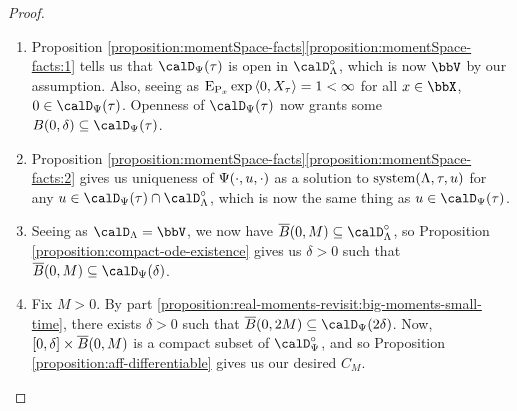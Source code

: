 \begin{proof}
  \begin{enumerate}[label=(\alph*)]
    \item
      Proposition \ref{proposition:momentSpace-facts}\ref{proposition:momentSpace-facts:1} tells us that $\momentSpace(\tau)$ is open in $\odeSpace^\circ$, which is now $\vecSpace$ by our assumption.
      Also, seeing as ${\operatorname{E}}_{{\operatorname{P}}_x}\exp{\langle 0 , X_\tau \rangle} = 1 < \infty$ for all $\stateVar \in \stateSpace$, $0 \in \momentSpace(\tau)$.
      Openness of $\momentSpace(\tau)$ now grants some $\ball{0}{\delta} \subseteq \momentSpace(\tau)$.
    \item
      Proposition \ref{proposition:momentSpace-facts}\ref{proposition:momentSpace-facts:2} gives us uniqueness of $\Psi(\cdot, u, \cdot)$ as a solution to $\operatorname{system}(\Lambda, \tau, u)$ for any $\momentVar \in \momentSpace(\tau) \cap \odeSpace^\circ$, which is now the same thing as $\momentVar \in \momentSpace(\tau)$.
    \item
      Seeing as $\odeSpace = \vecSpace$, we now have $\closedBall{0}{M} \subseteq \odeSpace^\circ$, so Proposition \ref{proposition:compact-ode-existence} gives us $\delta > 0$ such that $\closedBall{0}{M} \subseteq \momentSpace(\delta)$.
    \item
      Fix $M > 0$.
      By part \ref{proposition:real-moments-revisit:big-moments-small-time}, there exists $\delta > 0$ such that $\closedBall{0}{2M} \subseteq \momentSpace(2\delta)$.
      Now, $[0,\delta] \times {\overline B(0,M)}$ is a compact subset of $\momentSpace^\circ$, and so Proposition \ref{proposition:aff-differentiable} gives us our desired $C_M$.
  \end{enumerate}
\end{proof}
